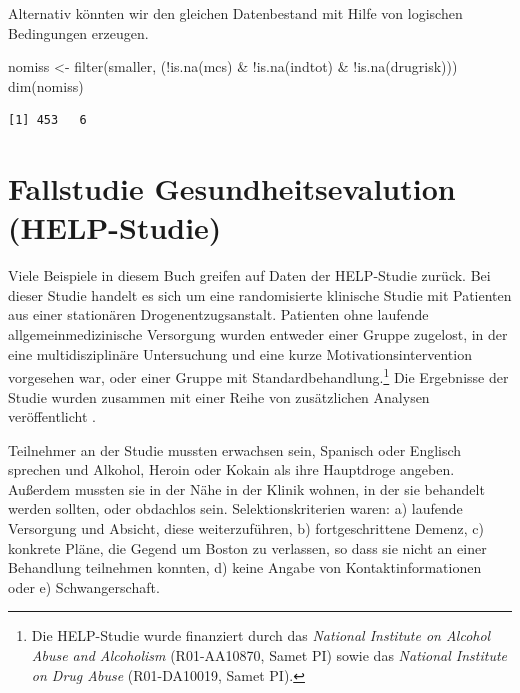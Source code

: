 \documentclass[
  ngerman,
]{scrbook}
\newenvironment{Shaded}{\begin{snugshade}}{\end{snugshade}}
\newcommand{\FunctionTok}[1]{\textcolor[rgb]{0.00,0.00,0.00}{#1}}
\newcommand{\NormalTok}[1]{#1}
\newcommand{\OtherTok}[1]{\textcolor[rgb]{0.56,0.35,0.01}{#1}}
\newcommand{\SpecialCharTok}[1]{\textcolor[rgb]{0.00,0.00,0.00}{#1}}
\begin{document}
Alternativ könnten wir den gleichen Datenbestand mit Hilfe von logischen Bedingungen erzeugen.

\begin{Shaded}
\begin{Highlighting}[]
\NormalTok{nomiss }\OtherTok{\textless{}{-}} \FunctionTok{filter}\NormalTok{(smaller, }
\NormalTok{                 (}\SpecialCharTok{!}\FunctionTok{is.na}\NormalTok{(mcs) }\SpecialCharTok{\&} \SpecialCharTok{!}\FunctionTok{is.na}\NormalTok{(indtot) }\SpecialCharTok{\&} \SpecialCharTok{!}\FunctionTok{is.na}\NormalTok{(drugrisk)))}
\FunctionTok{dim}\NormalTok{(nomiss)}
\end{Highlighting}
\end{Shaded}

\begin{verbatim}
[1] 453   6
\end{verbatim}

\hypertarget{HELPstudie}{%
\chapter{Fallstudie Gesundheitsevalution (HELP-Studie)}\label{HELPstudie}}

Viele Beispiele in diesem Buch greifen auf Daten der \textsc{HELP}-Studie zurück. Bei dieser Studie handelt es sich um eine randomisierte klinische Studie mit Patienten aus einer stationären Drogenentzugsanstalt. Patienten ohne laufende allgemeinmedizinische Versorgung wurden entweder einer Gruppe zugelost, in der eine multidisziplinäre Untersuchung und eine kurze Motivationsintervention vorgesehen war, oder einer Gruppe mit Standardbehandlung.\footnote{Die \textsc{HELP}-Studie wurde finanziert durch das \emph{National Institute on Alcohol Abuse and Alcoholism} (R01-AA10870, Samet PI) sowie das \emph{National Institute on Drug Abuse} (R01-DA10019, Samet PI).} Die Ergebnisse der Studie wurden zusammen mit einer Reihe von zusätzlichen Analysen veröffentlicht \autocite{samet2003,liebschutz2002,kertesz2003}.

Teilnehmer an der Studie mussten erwachsen sein, Spanisch oder Englisch sprechen und Alkohol, Heroin oder Kokain als ihre Hauptdroge angeben. Außerdem mussten sie in der Nähe in der Klinik wohnen, in der sie behandelt werden sollten, oder obdachlos sein. Selektionskriterien waren: a) laufende Versorgung und Absicht, diese weiterzuführen, b) fortgeschrittene Demenz, c) konkrete Pläne, die Gegend um Boston zu verlassen, so dass sie nicht an einer Behandlung teilnehmen konnten, d) keine Angabe von Kontaktinformationen oder e) Schwangerschaft.
\end{document}
